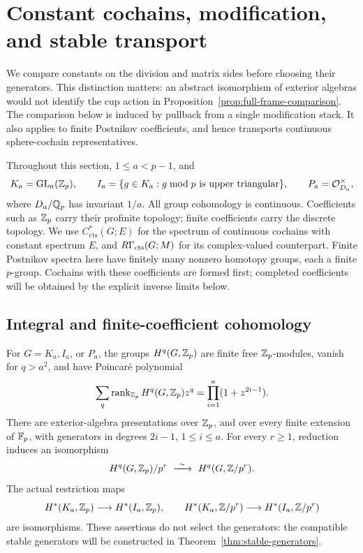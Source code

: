 \section{Constant cochains, modification, and stable transport}
\label{sec:constants}

We compare constants on the division and matrix sides before choosing their
generators.  This distinction matters: an abstract isomorphism of exterior
algebras would not identify the cup action in
Proposition~\ref{prop:full-frame-comparison}.  The comparison below is induced
by pullback from a single modification stack.  It also applies to finite
Postnikov coefficients, and hence transports continuous sphere-cochain
representatives.

Throughout this section, $1\leq a<p-1$, and
\[
 K_a=\operatorname{GL}_a(\mathbb Z_p),\qquad
 I_a=\{g\in K_a:g\bmod p\text{ is upper triangular}\},\qquad
 P_a=\mathcal O_{D_a}^{\times},
\]
where $D_a/\mathbb Q_p$ has invariant $1/a$.  All group cohomology is continuous.
Coefficients such as $\mathbb Z_p$ carry their profinite topology; finite coefficients
carry the discrete topology.  We use $C^*_{\mathrm{cts}}(G;E)$ for the spectrum
of continuous cochains with constant spectrum $E$, and
$R\Gamma_{\mathrm{cts}}(G;M)$ for its complex-valued counterpart.  Finite
Postnikov spectra here have finitely many nonzero homotopy groups, each a
finite $p$-group.  Cochains with these coefficients are formed first; completed
coefficients will be obtained by the explicit inverse limits below.

\subsection{Integral and finite-coefficient cohomology}

\begin{theorem}
\label{thm:constant-cohomology}
For $G=K_a,I_a$, or $P_a$, the groups $H^q(G,\mathbb Z_p)$ are finite free
$\mathbb Z_p$-modules, vanish for $q>a^2$, and have Poincar\'e polynomial
\begin{equation}
 \sum_q\operatorname{rank}_{\mathbb Z_p}H^q(G,\mathbb Z_p)z^q
       =\prod_{i=1}^a(1+z^{2i-1}).
 \label{eq:const-poincare}
\end{equation}
There are exterior-algebra presentations over $\mathbb Z_p$, and over every finite
extension of $\mathbb F_p$, with generators in degrees $2i-1$, $1\leq i\leq a$.
For every $r\geq1$, reduction induces an isomorphism
\begin{equation}
 H^q(G,\Zp)/p^r\ \xrightarrow{\ \sim\ }\ H^q(G,\Z/p^r).
 \label{eq:const-reduction}
\end{equation}
The actual restriction maps
\[
 H^*(K_a,\mathbb Z_p)\longrightarrow H^*(I_a,\mathbb Z_p),\qquad
 H^*(K_a,\mathbb Z/p^r)\longrightarrow H^*(I_a,\mathbb Z/p^r)
\]
are isomorphisms.  These assertions do not select the generators: the
compatible stable generators will be constructed in
Theorem~\ref{thm:stable-generators}.
\end{theorem}

